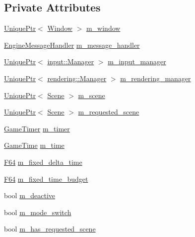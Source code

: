 \subsection*{Private Attributes}
\begin{DoxyCompactItemize}
\item 
\hyperlink{namespacemage_a3316d7143a973e37adf1110f2e80ca31}{Unique\+Ptr}$<$ \hyperlink{classmage_1_1_window}{Window} $>$ \hyperlink{classmage_1_1_engine_a8b710b9c37a48caad05896102c4b6980}{m\+\_\+window}
\item 
\hyperlink{classmage_1_1_engine_message_handler}{Engine\+Message\+Handler} \hyperlink{classmage_1_1_engine_a8359f22543fa6e39c948411e3023c397}{m\+\_\+message\+\_\+handler}
\item 
\hyperlink{namespacemage_a3316d7143a973e37adf1110f2e80ca31}{Unique\+Ptr}$<$ \hyperlink{classmage_1_1input_1_1_manager}{input\+::\+Manager} $>$ \hyperlink{classmage_1_1_engine_a33db04e6d27802054769ff6a30911261}{m\+\_\+input\+\_\+manager}
\item 
\hyperlink{namespacemage_a3316d7143a973e37adf1110f2e80ca31}{Unique\+Ptr}$<$ \hyperlink{classmage_1_1rendering_1_1_manager}{rendering\+::\+Manager} $>$ \hyperlink{classmage_1_1_engine_ae870ec5b532a21112500f0f0f03e9b55}{m\+\_\+rendering\+\_\+manager}
\item 
\hyperlink{namespacemage_a3316d7143a973e37adf1110f2e80ca31}{Unique\+Ptr}$<$ \hyperlink{classmage_1_1_scene}{Scene} $>$ \hyperlink{classmage_1_1_engine_a2d4037208a0529838c81ccea08c9de11}{m\+\_\+scene}
\item 
\hyperlink{namespacemage_a3316d7143a973e37adf1110f2e80ca31}{Unique\+Ptr}$<$ \hyperlink{classmage_1_1_scene}{Scene} $>$ \hyperlink{classmage_1_1_engine_a45160eecbdcbebcf269436505342db54}{m\+\_\+requested\+\_\+scene}
\item 
\hyperlink{classmage_1_1_game_timer}{Game\+Timer} \hyperlink{classmage_1_1_engine_a360589e71a3d081c6a748aa283d1526d}{m\+\_\+timer}
\item 
\hyperlink{classmage_1_1_game_time}{Game\+Time} \hyperlink{classmage_1_1_engine_ab5f56d65109d276dd49ba43c504bbd26}{m\+\_\+time}
\item 
\hyperlink{namespacemage_ad26233bbec640deda836e572c1a23708}{F64} \hyperlink{classmage_1_1_engine_a95557e1b6cba52b393c94d80d80bea4c}{m\+\_\+fixed\+\_\+delta\+\_\+time}
\item 
\hyperlink{namespacemage_ad26233bbec640deda836e572c1a23708}{F64} \hyperlink{classmage_1_1_engine_ad46dd72279d9d86b96d1b907575765e9}{m\+\_\+fixed\+\_\+time\+\_\+budget}
\item 
bool \hyperlink{classmage_1_1_engine_ab8a4b0157403708ae7d1d018a95b4c63}{m\+\_\+deactive}
\item 
bool \hyperlink{classmage_1_1_engine_aa5cb2e0b7bb2c4a9020e79ab832ee221}{m\+\_\+mode\+\_\+switch}
\item 
bool \hyperlink{classmage_1_1_engine_a96089c745442208679ea2e18cc6a6097}{m\+\_\+has\+\_\+requested\+\_\+scene}
\end{DoxyCompactItemize}


